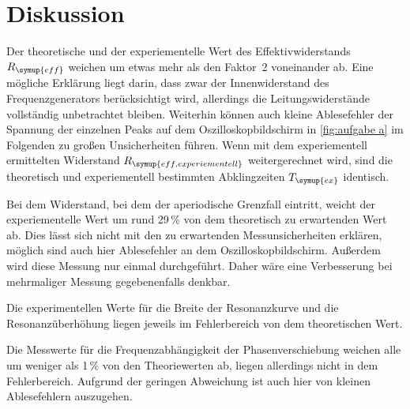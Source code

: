 \section{Diskussion}
\label{sec:Diskussion}
Der theoretische und der experiementelle Wert des Effektivwiderstands $R_{\symup{eff}}$ weichen um etwas mehr als den Faktor~2
voneinander ab. Eine mögliche Erklärung liegt darin, dass zwar der Innenwiderstand des Frequenzgenerators berücksichtigt wird, allerdings
die Leitungswiderstände vollständig unbetrachtet bleiben. Weiterhin können auch kleine Ablesefehler der Spannung der einzelnen Peaks auf
dem Oszilloskopbildschirm in \autoref{fig:aufgabe a} im Folgenden zu großen Unsicherheiten führen.
Wenn mit dem experiementell ermittelten Widerstand $R_{\symup{eff,experiementell}}$ weitergerechnet wird, sind die theoretisch und 
experiementell bestimmten Abklingzeiten $T_{\symup{ex}}$ identisch.

Bei dem Widerstand, bei dem der aperiodische Grenzfall eintritt, weicht der experiementelle Wert um rund 29\,\% von dem theoretisch zu 
erwartenden Wert ab. Dies lässt sich nicht mit den zu erwartenden Messunsicherheiten erklären, möglich sind auch hier Ablesefehler
an dem Oszilloskopbildschirm. Außerdem wird diese Messung nur einmal durchgeführt. Daher wäre eine Verbesserung bei mehrmaliger Messung
gegebenenfalls denkbar.

Die experimentellen Werte für die Breite der Resonanzkurve und die Resonanzüberhöhung liegen jeweils im Fehlerbereich von dem theoretischen
Wert.

Die Messwerte für die Frequenzabhängigkeit der Phasenverschiebung weichen alle um weniger als 1\,\% von den Theoriewerten ab, liegen 
allerdings nicht in dem Fehlerbereich. Aufgrund der geringen Abweichung ist auch hier von kleinen Ablesefehlern auszugehen.
